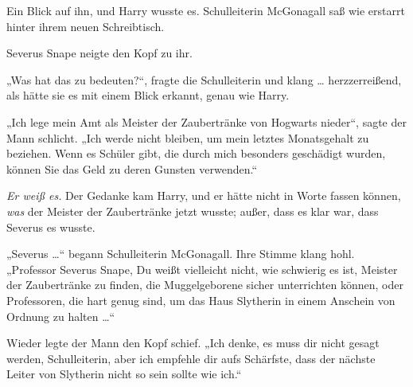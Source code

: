 Ein Blick auf ihn, und Harry wusste es. Schulleiterin McGonagall saß wie erstarrt hinter ihrem neuen Schreibtisch.

Severus Snape neigte den Kopf zu ihr.

„Was hat das zu bedeuten?“, fragte die Schulleiterin und klang … herzzerreißend, als hätte sie es mit einem Blick erkannt, genau wie Harry.

„Ich lege mein Amt als Meister der Zaubertränke von Hogwarts nieder“, sagte der Mann schlicht.
„Ich werde nicht bleiben, um mein letztes Monatsgehalt zu beziehen. Wenn es Schüler gibt, die durch mich besonders geschädigt wurden, können Sie das Geld zu deren Gunsten verwenden.“

\emph{Er weiß es.}
Der Gedanke kam Harry, und er hätte nicht in Worte fassen können, \emph{was} der Meister der Zaubertränke jetzt wusste; außer, dass es klar war, dass Severus es wusste.

„Severus …“ begann Schulleiterin McGonagall. Ihre Stimme klang hohl.
„Professor Severus Snape, Du weißt vielleicht nicht, wie schwierig es ist, Meister der Zaubertränke zu finden, die Muggelgeborene sicher unterrichten können, oder Professoren, die hart genug sind, um das Haus Slytherin in einem Anschein von Ordnung zu halten …“

Wieder legte der Mann den Kopf schief.
„Ich denke, es muss dir nicht gesagt werden, Schulleiterin, aber ich empfehle dir aufs Schärfste, dass der nächste Leiter von Slytherin nicht so sein sollte wie ich.“

